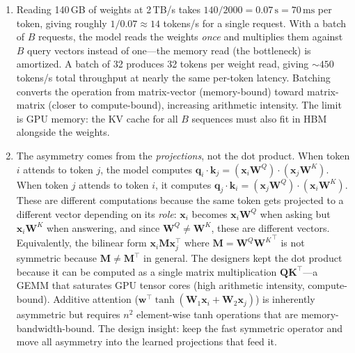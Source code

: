 \begin{enumerate}
    \item Reading 140\,GB of weights at 2\,TB/s takes $140/2000 = 0.07\,\text{s} = 70\,\text{ms}$ per token, giving roughly $1/0.07 \approx 14$ tokens/s for a single request. With a batch of $B$ requests, the model reads the weights \emph{once} and multiplies them against $B$ query vectors instead of one---the memory read (the bottleneck) is amortized. A batch of 32 produces 32 tokens per weight read, giving ${\sim}450$ tokens/s total throughput at nearly the same per-token latency. Batching converts the operation from matrix-vector (memory-bound) toward matrix-matrix (closer to compute-bound), increasing arithmetic intensity. The limit is GPU memory: the KV cache for all $B$ sequences must also fit in HBM alongside the weights.

    \item The asymmetry comes from the \emph{projections}, not the dot product. When token $i$ attends to token $j$, the model computes $\mathbf{q}_i \cdot \mathbf{k}_j = (\mathbf{x}_i\mathbf{W}^Q) \cdot (\mathbf{x}_j\mathbf{W}^K)$. When token $j$ attends to token $i$, it computes $\mathbf{q}_j \cdot \mathbf{k}_i = (\mathbf{x}_j\mathbf{W}^Q) \cdot (\mathbf{x}_i\mathbf{W}^K)$. These are different computations because the same token gets projected to a different vector depending on its \emph{role}: $\mathbf{x}_i$ becomes $\mathbf{x}_i\mathbf{W}^Q$ when asking but $\mathbf{x}_i\mathbf{W}^K$ when answering, and since $\mathbf{W}^Q \neq \mathbf{W}^K$, these are different vectors. Equivalently, the bilinear form $\mathbf{x}_i\mathbf{M}\mathbf{x}_j^\top$ where $\mathbf{M} = \mathbf{W}^Q{\mathbf{W}^K}^\top$ is not symmetric because $\mathbf{M} \neq \mathbf{M}^\top$ in general. The designers kept the dot product because it can be computed as a single matrix multiplication $\mathbf{Q}\mathbf{K}^\top$---a GEMM that saturates GPU tensor cores (high arithmetic intensity, compute-bound). Additive attention ($\mathbf{w}^\top \tanh(\mathbf{W}_1\mathbf{x}_i + \mathbf{W}_2\mathbf{x}_j)$) is inherently asymmetric but requires $n^2$ element-wise tanh operations that are memory-bandwidth-bound. The design insight: keep the fast symmetric operator and move all asymmetry into the learned projections that feed it.


\end{enumerate}
